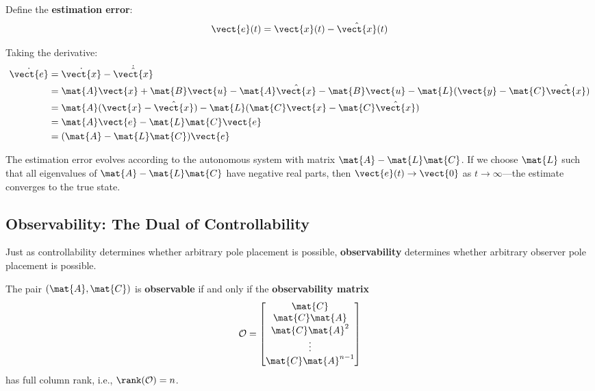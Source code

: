 Define the \textbf{estimation error}:
\begin{equation}
\vect{e}(t) = \vect{x}(t) - \hat{\vect{x}}(t)
\end{equation}

Taking the derivative:
\begin{align}
\dot{\vect{e}} &= \dot{\vect{x}} - \dot{\hat{\vect{x}}} \nonumber \\
&= \mat{A}\vect{x} + \mat{B}\vect{u} - \mat{A}\hat{\vect{x}} - \mat{B}\vect{u} - \mat{L}(\vect{y} - \mat{C}\hat{\vect{x}}) \nonumber \\
&= \mat{A}(\vect{x} - \hat{\vect{x}}) - \mat{L}(\mat{C}\vect{x} - \mat{C}\hat{\vect{x}}) \nonumber \\
&= \mat{A}\vect{e} - \mat{L}\mat{C}\vect{e} \nonumber \\
&= (\mat{A} - \mat{L}\mat{C})\vect{e}
\label{eq:observer_error_dynamics}
\end{align}

The estimation error evolves according to the autonomous system with matrix $\mat{A} - \mat{L}\mat{C}$. If we choose $\mat{L}$ such that all eigenvalues of $\mat{A} - \mat{L}\mat{C}$ have negative real parts, then $\vect{e}(t) \to \vect{0}$ as $t \to \infty$---the estimate converges to the true state.


\subsection{Observability: The Dual of Controllability}

Just as controllability determines whether arbitrary pole placement is possible, \textbf{observability} determines whether arbitrary observer pole placement is possible.

\begin{definition}[Observability]
The pair $(\mat{A}, \mat{C})$ is \textbf{observable} if and only if the \textbf{observability matrix}
\begin{equation}
\mathcal{O} = \begin{bmatrix} \mat{C} \\ \mat{C}\mat{A} \\ \mat{C}\mat{A}^2 \\ \vdots \\ \mat{C}\mat{A}^{n-1} \end{bmatrix}
\label{eq:observability_matrix}
\end{equation}
has full column rank, i.e., $\rank(\mathcal{O}) = n$.
\end{definition}

